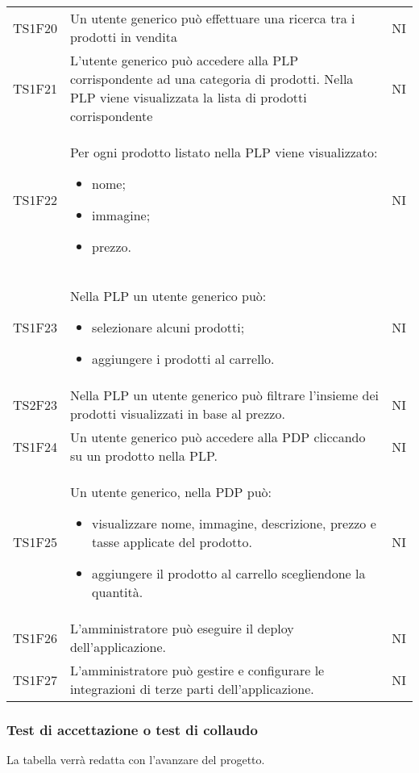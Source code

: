 {\begin{longtable}{C{3cm} C{10.2cm} C{1.5cm}}
TS1F20 & Un utente generico può effettuare una ricerca tra i prodotti in vendita & NI\\

TS1F21 & L'utente generico può accedere alla PLP corrispondente ad una categoria di prodotti. Nella PLP viene visualizzata la lista di prodotti corrispondente & NI\\

TS1F22 & Per ogni prodotto listato nella PLP viene visualizzato:
\begin{itemize}
	\item nome;
	\item immagine;
	\item prezzo.
\end{itemize} & NI\\

TS1F23 & Nella PLP un utente generico può:
\begin{itemize}
	\item selezionare alcuni prodotti;
	\item aggiungere i prodotti al carrello.
\end{itemize} & NI\\

TS2F23 & Nella PLP un utente generico può filtrare l'insieme dei prodotti visualizzati in base al prezzo. & NI\\

TS1F24 & Un utente generico può accedere alla PDP cliccando su un prodotto nella PLP. & NI\\

TS1F25 & Un utente generico, nella PDP può:
\begin{itemize}
	\item visualizzare nome, immagine, descrizione, prezzo e tasse applicate del prodotto.
	\item aggiungere il prodotto al carrello scegliendone la quantità.
\end{itemize} & NI\\

TS1F26 & L'amministratore può eseguire il deploy dell'applicazione. & NI\\

TS1F27 & L'amministratore può gestire e configurare le integrazioni di terze parti dell'applicazione. & NI\\



\end{longtable}


}
\subsubsection{Test di accettazione o test di collaudo}
La tabella verrà redatta con l'avanzare del progetto.